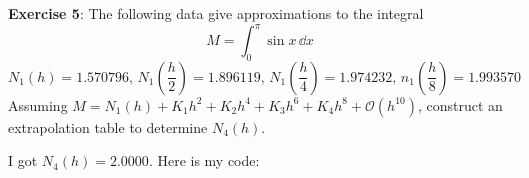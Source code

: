 \documentclass{article}
\begin{document}
\textbf{Exercise 5}: The following data give approximations to the integral
    \begin{equation*}
        M = \int_{0}^{\pi} \sin{x} \, \dd{x}
    \end{equation*}
    \begin{equation*}
        N_{1}(h) = 1.570796, \, N_{1}\left(\dfrac{h}{2}\right) = 1.896119, \, N_{1}\left(\dfrac{h}{4}\right) = 1.974232, \, n_{1}\left(\dfrac{h}{8}\right) = 1.993570
    \end{equation*}
Assuming $M = N_{1}(h) + K_{1}h^{2} + K_{2}h^{4} + K_{3}h^{6} + K_{4}h^{8} + \mathcal{O}(h^{10})$, construct an extrapolation table to determine $N_{4}(h)$.
    \begin{answer}
        I got $N_{4}(h) = 2.0000$. Here is my code:
        \inputminted{matlab}{./code/Derivative/ThreePointEndpoint.m}
        \inputminted{matlab}{./code/Derivative/ThreePointMidpoint.m}
        \inputminted{matlab}{./code/Derivative/approxDerive.m}
        \inputminted{matlab}{./code/Extrapolation/Extrapolate.m}
        \inputminted{matlab}{./code/script4.m}
    \end{answer}
\end{document}
